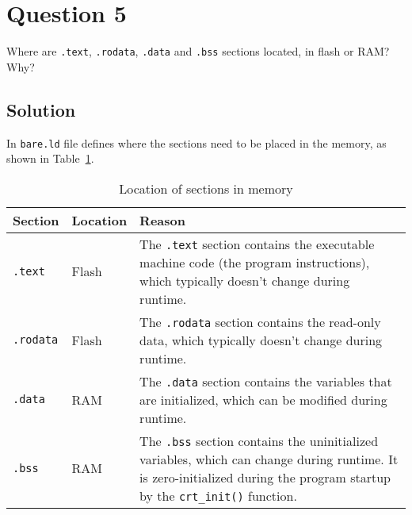 \section*{Question 5}

Where are \texttt{.text}, \texttt{.rodata}, \texttt{.data} and \texttt{.bss} sections located, in flash or RAM?
Why?

\subsection*{Solution}

In \texttt{bare.ld} file defines where the sections need to be placed in the memory, as shown in Table~\ref{tab:sections}.
\begin{table}[h]
    \centering
    \begin{tabular}{p{2cm} p{2cm} p{10cm}} \toprule
        \textbf{Section}  &
        \textbf{Location} &
        \textbf{Reason}
        \\ \midrule
        \texttt{.text}    &
        Flash             &
        The \texttt{.text} section contains the executable machine code (the program instructions), which typically doesn't change during runtime.
        \\
        \texttt{.rodata}  &
        Flash             &
        The \texttt{.rodata} section contains the read-only data, which typically doesn't change during runtime.
        \\
        \texttt{.data}    &
        RAM               &
        The \texttt{.data} section contains the variables that are initialized, which can be modified during runtime.
        \\
        \texttt{.bss}     &
        RAM               &
        The \texttt{.bss} section contains the uninitialized variables, which can change during runtime.
        It is zero-initialized during the program startup by the \texttt{crt\_init\@()} function.
        \\ \bottomrule
    \end{tabular}
    \caption{
        Location of sections in memory
    }\label{tab:sections}
\end{table}
